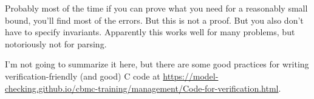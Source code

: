 \documentclass[11pt]{article}
\begin{document}
Probably most of the time if you can prove what you need for a reasonably small bound, you'll find most of the errors.
But this is not a proof. But you also don't have to specify invariants. Apparently this works well for many
problems, but notoriously not for parsing.

I'm not going to summarize it here, but there are some good practices for writing verification-friendly
(and good) C code at \url{https://model-checking.github.io/cbmc-training/management/Code-for-verification.html}.
\end{document}
